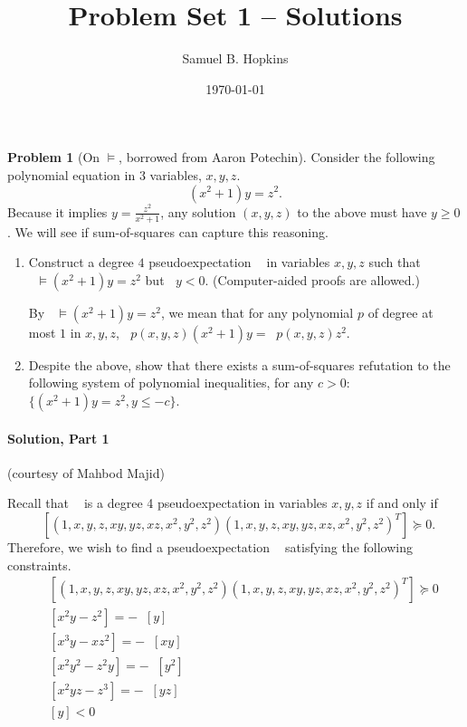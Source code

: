 \documentclass[11pt]{article}
\title{Problem Set 1 -- Solutions}
\author{Samuel B. Hopkins}
\date{\today}
\theoremstyle{definition}
\newtheorem{problem}[theorem]{Problem}
\newcommand{\brac}[1]{\left[ #1 \right]}
\DeclareMathOperator{\pE}{\widetilde{\mathbb{E}}} %
\begin{document}
\maketitle

\begin{problem}[On $\vDash$, borrowed from Aaron Potechin]

  Consider the following polynomial equation in $3$ variables, $x,y,z$.
  \[ (x^2 + 1) y = z^2. \]
  Because it implies $y = \frac{z^2}{x^2+1}$, any solution $(x,y,z)$ to the above must have $y \ge 0$. We will see if sum-of-squares can capture this reasoning.

  \begin{enumerate}
    \item Construct a degree $4$ pseudoexpectation $\pE$ in variables $x,y,z$ such that $\pE \vDash (x^2+1)y = z^2$ but $\pE y < 0$. (Computer-aided proofs are allowed.)

    By $\pE \vDash (x^2+1)y = z^2$, we mean that for any polynomial $p$ of degree at most $1$ in $x,y,z$, $\pE p(x,y,z)(x^2+1)y = \pE p(x,y,z)z^2$.

    \item Despite the above, show that there exists a sum-of-squares refutation to the following system of polynomial inequalities, for any $c > 0$: $\{ (x^2+1)y = z^2 , y \le -c \}$.
  \end{enumerate}
\end{problem}


\paragraph{Solution, Part 1} (courtesy of Mahbod Majid)

  Recall that $\pE$ is a degree 4 pseudoexpectation in variables $x,y,z$ if and only if
  \[ \pE \brac{(1, x, y, z, xy, yz, xz, x^2, y^2, z^2)(1, x, y, z, xy, yz, xz, x^2, y^2, z^2)^T} \succcurlyeq 0. \]
  Therefore, we wish to find a pseudoexpectation $\pE$ satisfying the following constraints.
  \begin{align*}
      &\pE \brac{(1, x, y, z, xy, yz, xz, x^2, y^2, z^2)(1, x, y, z, xy, yz, xz, x^2, y^2, z^2)^T} \succcurlyeq 0\\
      &\pE \brac{x^2 y - z^2} = -\pE\brac{y} \\
      &\pE \brac{x^3 y - xz^2} = -\pE\brac{xy} \\
      &\pE \brac{x^2 y^2 - z^2y} = -\pE\brac{y^2} \\
      &\pE \brac{x^2 y z - z^3} = -\pE\brac{yz} \\
      &\pE \brac{y} < 0
  \end{align*}
\end{document}

